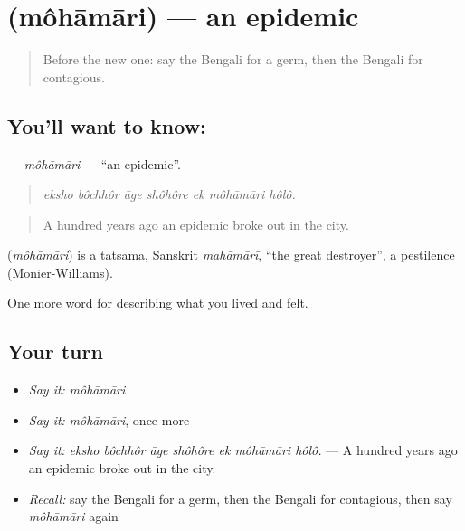 \section[\texorpdfstring{\bn{মহামারি} (môhāmāri)}{মহামারি (môhāmāri)}]{ (môhāmāri) — an epidemic}

\label{lesson:BN-C473-mohamari}



\begin{quote}
Before the new one: say the Bengali for a germ, then the Bengali for contagious.
\end{quote}

\subsection*{You'll want to know: }
\textbf{} — \emph{môhāmāri} — \textquotedblleft{}an epidemic\textquotedblright{}.

\begin{quote}
      
\end{quote}

\begin{quote}
\emph{eksho bôchhôr āge shôhôre ek môhāmāri hôlô.}
\end{quote}

\begin{quote}
A hundred years ago an epidemic broke out in the city.
\end{quote}

\begin{cousinweb}
\textbf{} (\emph{môhāmāri}) is a tatsama, Sanskrit \emph{mahāmārī}, \textquotedblleft{}the great destroyer\textquotedblright{}, a pestilence (Monier-Williams).
\end{cousinweb}

\begin{grammarlens}[title={What you've built}]
One more word for describing what you lived and felt.
\end{grammarlens}

\subsection*{Your turn}
\begin{itemize}
\raggedright
  \item \emph{Say it:} \emph{môhāmāri}
  \item \emph{Say it:} \emph{môhāmāri}, once more
  \item \emph{Say it:} \emph{eksho bôchhôr āge shôhôre ek môhāmāri hôlô.} — A hundred years ago an epidemic broke out in the city.
  \item \emph{Recall:} say the Bengali for a germ, then the Bengali for contagious, then say \emph{môhāmāri} again
\end{itemize}

